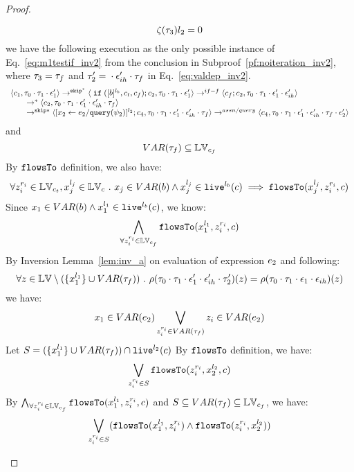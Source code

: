 \begin{proof}
\begin{case}
\begin{subcase}
\begin{subsubcase}
\begin{subproof}
\begin{enumerate}
\begin{enumerate}
\[
  \mathtt{\zeta}(\mathtt{\tau}_3)l_2 = 0
\]
we have the following execution as the only possible instance of Eq.~\ref{eq:m1testif_inv2} from the conclusion in Subproof~\ref{pf:noiteration_inv2}, where $\mathtt{\tau}_3 = \mathtt{\tau}_f$ 
and $\mathtt{\tau}_2' = {} \cdot {} \mathtt{\epsilon}_{ih}' \cdot \mathtt{\tau}_f$ in Eq.~\ref{eq:valdep_inv2}.
\[
    \begin{array}{l}   
  \langle c_1, \mathtt{\tau}_0 \cdot \mathtt{\tau}_1 \cdot \mathtt{\epsilon}_1' \rangle 
  \rightarrow^{\mathtt{skip}^*} 
  \langle \;\mathtt{if}\; ([b]^{l_b}, c_t, c_f); {c}_2, \mathtt{\tau}_0 \cdot \mathtt{\tau}_1 \cdot \mathtt{\epsilon}_1' \rangle 
  \rightarrow^{if-f} 
  \langle c_f;c_2, \mathtt{\tau}_0 \cdot \mathtt{\tau}_1 \cdot \mathtt{\epsilon}_1' \cdot \mathtt{\epsilon}_{ih}' \rangle 
  \\
  \qquad \rightarrow^{*} 
  \langle c_2, 
  \mathtt{\tau}_0 \cdot \mathtt{\tau}_1 \cdot \mathtt{\epsilon}_1' \cdot \mathtt{\epsilon}_{ih}' \cdot \mathtt{\tau}_f \rangle
  \\
  \qquad \rightarrow^{\mathtt{skip}*} 
  \langle [\mathrel{ {x}_2 \leftarrow e_2 / {\tt query}(\psi_2) }]^{l_2};{c}_4, 
  \mathtt{\tau}_0 \cdot \mathtt{\tau}_1 \cdot \mathtt{\epsilon}_1' \cdot \mathtt{\epsilon}_{ih}' \cdot \mathtt{\tau}_f \rangle
  \rightarrow^{assn/query} 
  \langle {c}_4,  \mathtt{\tau}_0 \cdot \mathtt{\tau}_1 \cdot \mathtt{\epsilon}_1' \cdot \mathtt{\epsilon}_{ih}' \cdot \mathtt{\tau}_f \cdot \mathtt{\epsilon}_2' \rangle 
\end{array}
\]
and 
\[
  VAR{(\mathtt{\tau}_f)} \subseteq \mathbb{LV}_{c_f}
\]
%
By $\mathtt{flowsTo}$ definition, we also have:
\[
  \forall z_i^{r_i} \in \mathbb{LV}_{c_t},  x_j^{l_j} \in \mathbb{LV}_c ~.~ 
  x_j \in VAR(b) \land x_j^{l_j} \in \mathtt{live}^{l_b}(c) \implies
  \mathtt{flowsTo}(x_j^{l_j}, z_i^{r_i}, c)
\]
Since $x_1 \in VAR(b) \land x_1^{l_1} \in \mathtt{live}^{l_b}(c)$, we know: 
\[
  \bigwedge_{\forall z_i^{r_i} \in \mathbb{LV}_{c_f}}
  \mathtt{flowsTo}(x_1^{l_1}, z_i^{r_i}, c)
\]
%
By Inversion Lemma~\ref{lem:inv_a} on evaluation of expression $e_2$ and following: 
\[
  \forall z \in \mathbb{LV} \setminus (\{x_1^{l_1}\} \cup VAR{(\mathtt{\tau}_f)}) ~.~
  \rho(\mathtt{\tau}_0 \cdot \mathtt{\tau}_1 \cdot \mathtt{\epsilon}_1'\cdot \mathtt{\epsilon}_{ih}' \cdot \mathtt{\tau}_2')(z) 
  = \rho(\mathtt{\tau}_0 \cdot \mathtt{\tau}_1 \cdot \mathtt{\epsilon}_1\cdot \mathtt{\epsilon}_{ih})(z)
\]
%
we have:
\[
  x_1 \in VAR(e_2) \bigvee_{z_i^{r_i} \in VAR{(\mathtt{\tau}_f)}} z_i \in VAR(e_2)
\]
%
Let $S = (\{x_1^{l_1}\} \cup VAR{(\mathtt{\tau}_f)}) \cap \mathtt{live}^{l_2}(c) $
%
By $\mathtt{flowsTo}$ definition, we have:
\[
   \bigvee_{z_i^{r_i} \in S}  \mathtt{flowsTo}(z_i^{r_i}, x_2^{l_2}, c)
\]
By $ \bigwedge_{\forall z_i^{r_i} \in \mathbb{LV}_{c_f}} \mathtt{flowsTo}(x_1^{l_1}, z_i^{r_i}, c)$ and $S \subseteq VAR{(\mathtt{\tau}_f)} \subseteq \mathbb{LV}_{c_f}$, we have:
\[
\bigvee_{z_i^{r_i} \in S} 
(\mathtt{flowsTo}(x_1^{l_1}, z_i^{r_i}) \land \mathtt{flowsTo}(z_i^{r_i}, x_2^{l_2}))
\]
\end{enumerate}
\end{enumerate}
\end{subproof}
\end{subsubcase}
\end{subcase}
\end{case}
\end{proof}

